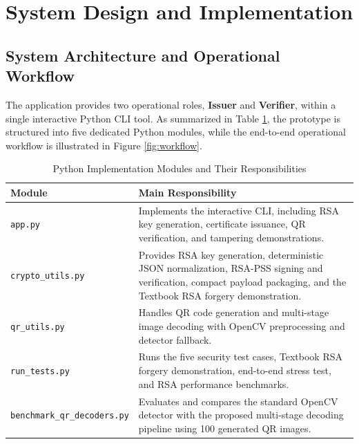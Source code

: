 \documentclass[10pt,a4paper]{article}
\begin{document}
\section{System Design and Implementation}

\subsection{System Architecture and Operational Workflow}
The application provides two operational roles, \textbf{Issuer} and \textbf{Verifier}, within a single interactive Python CLI tool. As summarized in Table \ref{tab:implementation}, the prototype is structured into five dedicated Python modules, while the end-to-end operational workflow is illustrated in Figure \ref{fig:workflow}.

\begin{table}[!htbp]
\centering
\caption{Python Implementation Modules and Their Responsibilities}
\label{tab:implementation}
\small
\begin{tabularx}{\textwidth}{>{\raggedright\arraybackslash}p{3.5cm} X}
\toprule
\textbf{Module} & \textbf{Main Responsibility} \\
\midrule
\texttt{app.py} & Implements the interactive CLI, including RSA key generation, certificate issuance, QR verification, and tampering demonstrations. \\
\texttt{crypto\_utils.py} & Provides RSA key generation, deterministic JSON normalization, RSA-PSS signing and verification, compact payload packaging, and the Textbook RSA forgery demonstration. \\
\texttt{qr\_utils.py} & Handles QR code generation and multi-stage image decoding with OpenCV preprocessing and detector fallback. \\
\texttt{run\_tests.py} & Runs the five security test cases, Textbook RSA forgery demonstration, end-to-end stress test, and RSA performance benchmarks. \\
\texttt{benchmark\_qr\_decoders.py} & Evaluates and compares the standard OpenCV detector with the proposed multi-stage decoding pipeline using 100 generated QR images. \\
\bottomrule
\end{tabularx}
\end{table}
\end{document}
